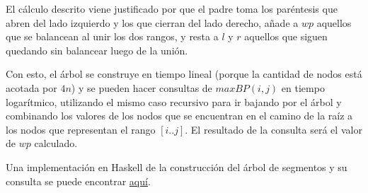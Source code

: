 \documentclass[letterpaper, 12pt]{article}
\begin{document}
\begin{enumerate}
\begin{itemize}
    El cálculo descrito viene justificado por que el padre toma los paréntesis que abren del lado izquierdo y los que cierran del lado derecho, añade a $wp$ aquellos que se balancean al unir los dos rangos, y resta a $l$ y $r$ aquellos que siguen quedando sin balancear luego de la unión.
\end{itemize}

Con esto, el árbol se construye en tiempo lineal (porque la cantidad de nodos está acotada por $4n$) y se pueden hacer consultas de $maxBP(i, j)$ en tiempo logarítmico, utilizando el mismo caso recursivo para ir bajando por el árbol y combinando los valores de los nodos que se encuentran en el camino de la raíz a los nodos que representan el rango $[i..j]$. El resultado de la consulta será el valor de $wp$ calculado.

Una implementación en Haskell de la construcción del árbol de segmentos y su consulta se puede encontrar \href{https://gitfront.io/r/chrischriscris/swaWSXShzVoW/Tareas-CI5651-EM2024/tree/tarea3/ej3/}{aquí}.

\end{enumerate} \vspace{4mm}
\end{document}
